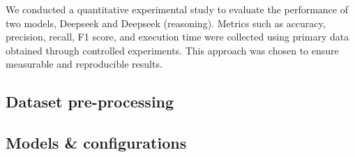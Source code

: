 We conducted a quantitative experimental study to evaluate the performance of two
models, Deepseek and Deepseek (reasoning). Metrics such as accuracy, precision, recall,
F1 score, and execution time were collected using primary data obtained through controlled
experiments. This approach was chosen to ensure measurable and reproducible
results.
%

\subsection{Dataset pre-processing}
%

\subsection{Models \& configurations}
%
%
%

